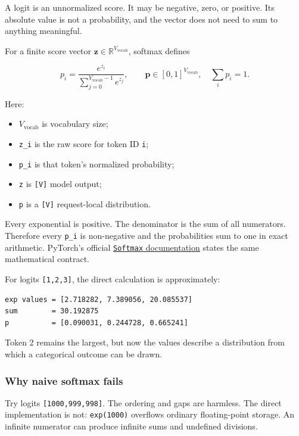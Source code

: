 \documentclass[
  10pt,
]{article}
\providecommand{\tightlist}{%
  \setlength{\itemsep}{0pt}\setlength{\parskip}{0pt}}
\begin{document}
A logit is an unnormalized score. It may be negative, zero, or positive.
Its absolute value is not a probability, and the vector does not need to
sum to anything meaningful.

For a finite score vector
\(\mathbf{z}\in\mathbb{R}^{V_{\mathrm{vocab}}}\), softmax defines

\[
p_i=\frac{e^{z_i}}
{\sum_{j=0}^{V_{\mathrm{vocab}}-1}e^{z_j}},
\qquad
\mathbf{p}\in[0,1]^{V_{\mathrm{vocab}}},
\quad \sum_i p_i=1.
\]

Here:

\begin{itemize}
\tightlist
\item
  \(V_{\mathrm{vocab}}\) is vocabulary size;
\item
  \texttt{z\_i} is the raw score for token ID \texttt{i};
\item
  \texttt{p\_i} is that token's normalized probability;
\item
  \texttt{z} is \texttt{{[}V{]}} model output;
\item
  \texttt{p} is a \texttt{{[}V{]}} request-local distribution.
\end{itemize}

Every exponential is positive. The denominator is the sum of all
numerators. Therefore every \texttt{p\_i} is non-negative and the
probabilities sum to one in exact arithmetic. PyTorch's official
\href{https://docs.pytorch.org/docs/stable/generated/torch.nn.Softmax.html}{\texttt{Softmax}
documentation} states the same mathematical contract.

For logits \texttt{{[}1,2,3{]}}, the direct calculation is
approximately:

\begin{verbatim}
exp values = [2.718282, 7.389056, 20.085537]
sum        = 30.192875
p          = [0.090031, 0.244728, 0.665241]
\end{verbatim}

Token 2 remains the largest, but now the values describe a distribution
from which a categorical outcome can be drawn.

\subsubsection{Why naive softmax fails}\label{why-naive-softmax-fails}

Try logits \texttt{{[}1000,999,998{]}}. The ordering and gaps are
harmless. The direct implementation is not: \texttt{exp(1000)} overflows
ordinary floating-point storage. An infinite numerator can produce
infinite sums and undefined divisions.
\end{document}
